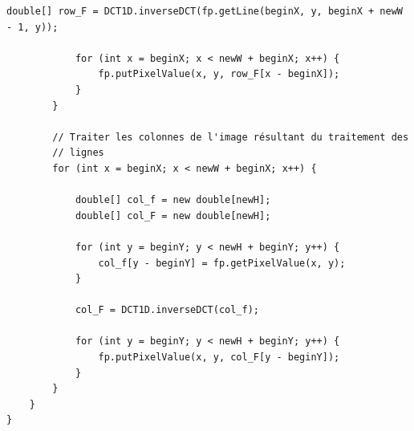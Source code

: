 \documentclass[a4paper,11pt]{article}
\begin{document}
\begin{lstlisting}[caption=Code du calcul de la DCT en 2D]
			double[] row_F = DCT1D.inverseDCT(fp.getLine(beginX, y, beginX + newW - 1, y));

			for (int x = beginX; x < newW + beginX; x++) {
				fp.putPixelValue(x, y, row_F[x - beginX]);
			}
		}

		// Traiter les colonnes de l'image résultant du traitement des
		// lignes
		for (int x = beginX; x < newW + beginX; x++) {

			double[] col_f = new double[newH];
			double[] col_F = new double[newH];

			for (int y = beginY; y < newH + beginY; y++) {
				col_f[y - beginY] = fp.getPixelValue(x, y);
			}

			col_F = DCT1D.inverseDCT(col_f);

			for (int y = beginY; y < newH + beginY; y++) {
				fp.putPixelValue(x, y, col_F[y - beginY]);
			}
		}
	}
}
  \end{lstlisting}
\end{document}
